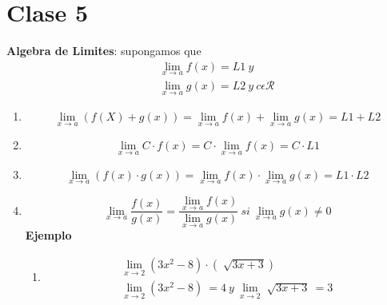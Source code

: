 \documentclass{article}
\begin{document}
    \section{Clase 5}
    \textbf{Algebra de Limites}: supongamos que \begin{equation}
        \begin{aligned}
        && \lim_{x\rightarrow a}f(x) = L1 \ y \\
        && \lim_{x\rightarrow a}g(x) = L2 \ y \ c \epsilon \mathcal{R}
        \end{aligned}
    \end{equation}

    \begin{enumerate}
        \item \begin{equation}
            \lim_{x\rightarrow a} (f(X)+g(x)) = \lim_{x\rightarrow a}f(x) + 
            \lim_{x\rightarrow a} g(x) = L1 +L2
        \end{equation}
        \item \begin{equation}
            \lim_{x \rightarrow a}C\cdot f(x) = C\cdot \lim_{x\rightarrow a}f(x)
            = C\cdot L1
        \end{equation}
        \item \begin{equation}
            \lim_{x\rightarrow a} (f(x)\cdot g(x)) = 
            \lim_{x \rightarrow a} f(x) \cdot \lim_{x \rightarrow a} g(x) 
            = L1 \cdot L2
        \end{equation}
        \item \begin{equation}
            \lim_{x\rightarrow a} \frac{f(x)}{g(x)} = \frac{\lim_{x\rightarrow a}f(x)}{\lim_{x\rightarrow a}g(x)} 
            \ si \ \lim_{x\rightarrow a}g(x) \neq 0
        \end{equation}
    \textbf{Ejemplo}
    \begin{enumerate}
        \item \begin{equation} \begin{aligned}
            \lim_{x\rightarrow 2} (3x^2 -8)\cdot(\sqrt[]{3x+3}) \\
            \lim_{x\rightarrow 2} (3x^2 -8)\ =4 \ y \ \lim_{x\rightarrow 2}\sqrt[]{3x+3} \ =3
        \end{aligned}
        \end{equation} \begin{center}

\end{center}
\end{enumerate}
\end{enumerate}
\end{document}
